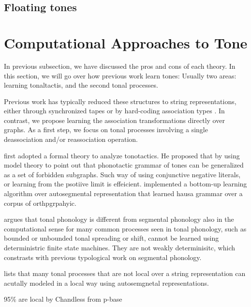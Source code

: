 \subsection{Floating tones}


\section{Computational Approaches to Tone}

In previous subsection, we have discussed the pros and cons
of each theory. In this section, we will go over how previous work
learn tones: Usually two areas: learning tonaltactis, and the second
tonal processes. 

Previous work has typically reduced these structures to string 
	representations, either through synchronized tapes or by hard-coding association types \citep{wiebe1992modelling,bird1994one,yli2013finite,yli2015three,rawski2020multi}.
	In contrast, we propose learning the association transformations directly over graphs.
	As a first step, we focus on tonal processes involving a single deassociation and/or reassociation operation.
	

\citet{jardine2017LocalNature,jardine2016locality} first adopted a formal theory
to analyze tonotactics. He proposed that by using model theory to point out that
phonotactic grammar of tones can be generalized as a set of forbidden subgraphs.
Such way of using conjunctive negative literals, or learning from the psotiive 
limit is effeicient. \citet{li2025learning} implemented a bottom-up learning 
algorithm over autosegmental representation that learned hausa grammar over
a  corpus of orthpgrpahyic.


\citep{jardineComputationallyToneDifferent2016} argues that tonal phonology
is different from segmental phonology also in the computational sense for 
many common processes seen in tonal phonology, such as bounded or unbounded
tonal spreading or shift, cannot be learned using deterministric finite
state machines. They are not weakly determinisitc, which constrasts with 
previous typological work on segmental phonology.

\citet{chandlee2019autosegmental} lists
that many tonal processes that are not local over a string representation
can acutally modeled in a local way using autosemgnetal representations.

95\% are local by Chandless from p-base